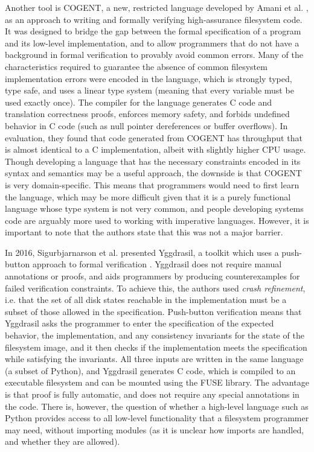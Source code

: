 Another tool is COGENT, a new, restricted language developed by Amani et al. \cite{amani2016}, as an approach to writing and formally verifying high-assurance filesystem code.
It was designed to bridge the gap between the formal specification of a program and its low-level implementation, and to allow programmers that do not have a background in formal verification to provably avoid common errors.
Many of the characteristics required to guarantee the absence of common filesystem implementation errors were encoded in the language, which is strongly typed, type safe, and uses a linear type system (meaning that every variable must be used exactly once).
The compiler for the language generates C code and translation correctness proofs, enforces memory safety, and forbids undefined behavior in C code (such as null pointer dereferences or buffer overflows).
In evaluation, they found that code generated from COGENT has throughput that is almost identical to a C implementation, albeit with slightly higher CPU usage.
Though developing a language that has the necessary constraints encoded in its syntax and semantics may be a useful approach, the downside is that COGENT is very domain-specific.
This means that programmers would need to first learn the language, which may be more difficult given that it is a purely functional language whose type system is not very common, and people developing systems code are arguably more used to working with imperative languages.
However, it is important to note that the authors state that this was not a major barrier.

In 2016, Sigurbjarnarson et al. presented Yggdrasil, a toolkit which uses a push-button approach to formal verification \cite{sigurbjarnarson2016}.
Yggdrasil does not require manual annotations or proofs, and aids programmers by producing counterexamples for failed verification constraints.
To achieve this, the authors used \textit{crash refinement}, i.e. that the set of all disk states reachable in the implementation must be a subset of those allowed in the specification.
Push-button verification means that Yggdrasil asks the programmer to enter the specification of the expected behavior, the implementation, and any consistency invariants for the state of the filesystem image, and it then checks if the implementation meets the specification while satisfying the invariants.
All three inputs are written in the same language (a subset of Python), and Yggdrasil generates C code, which is compiled to an executable filesystem and can be mounted using the FUSE library.
The advantage is that proof is fully automatic, and does not require any special annotations in the code.
There is, however, the question of whether a high-level language such as Python provides access to all low-level functionality that a filesystem programmer may need, without importing modules (as it is unclear how imports are handled, and whether they are allowed).

